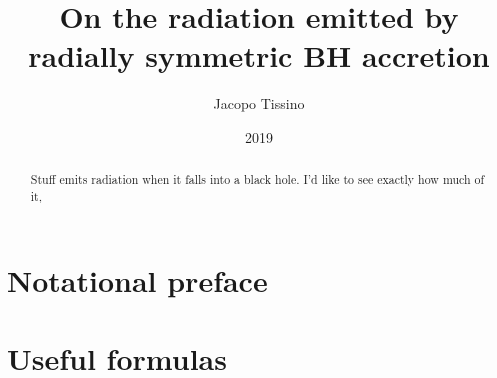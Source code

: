 \documentclass[a4paper, 12pt]{article}
\title{On the radiation emitted by radially symmetric BH accretion}
\author{Jacopo Tissino}
\date{2019}
\begin{document}
\maketitle

\begin{abstract}
Stuff emits radiation when it falls into a black hole. I'd like to see exactly how much of it,
\end{abstract}

\section{Notational preface}



\section{Useful formulas}



\printbibliography[title={Bibliography}]
\end{document}
